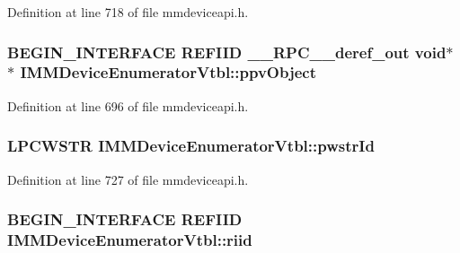 Definition at line 718 of file mmdeviceapi.\+h.

\subsubsection[{\texorpdfstring{ppv\+Object}{ppvObject}}]{\setlength{\rightskip}{0pt plus 5cm}B\+E\+G\+I\+N\+\_\+\+I\+N\+T\+E\+R\+F\+A\+CE {\bf R\+E\+F\+I\+ID} {\bf \+\_\+\+\_\+\+R\+P\+C\+\_\+\+\_\+deref\+\_\+out} {\bf void}$\ast$$\ast$ I\+M\+M\+Device\+Enumerator\+Vtbl\+::ppv\+Object}\hypertarget{struct_i_m_m_device_enumerator_vtbl_a9be5f48179fc9ca89ab03a9449f9e1a8}{}\label{struct_i_m_m_device_enumerator_vtbl_a9be5f48179fc9ca89ab03a9449f9e1a8}


Definition at line 696 of file mmdeviceapi.\+h.

\subsubsection[{\texorpdfstring{pwstr\+Id}{pwstrId}}]{ {\bf L\+P\+C\+W\+S\+TR} I\+M\+M\+Device\+Enumerator\+Vtbl\+::pwstr\+Id}\hypertarget{struct_i_m_m_device_enumerator_vtbl_a78f8bce94e89353b61d73c7f4174ea8f}{}\label{struct_i_m_m_device_enumerator_vtbl_a78f8bce94e89353b61d73c7f4174ea8f}


Definition at line 727 of file mmdeviceapi.\+h.

\subsubsection[{\texorpdfstring{riid}{riid}}]{\setlength{\rightskip}{0pt plus 5cm}B\+E\+G\+I\+N\+\_\+\+I\+N\+T\+E\+R\+F\+A\+CE {\bf R\+E\+F\+I\+ID} I\+M\+M\+Device\+Enumerator\+Vtbl\+::riid}\hypertarget{struct_i_m_m_device_enumerator_vtbl_aba931ea01d817d3ad62e002e6095b026}{}\label{struct_i_m_m_device_enumerator_vtbl_aba931ea01d817d3ad62e002e6095b026}


